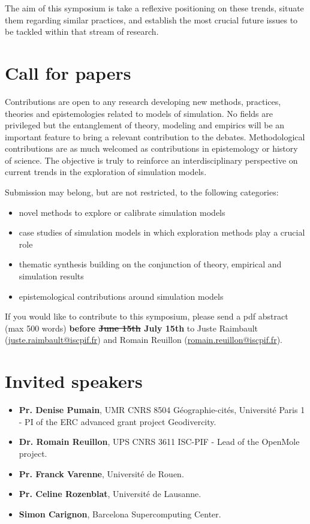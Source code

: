 \documentclass[11pt]{article}
\begin{document}
\medskip

The aim of this symposium is take a reflexive positioning on these trends, situate them regarding similar practices, and establish the most crucial future issues to be tackled within that stream of research.

\section*{Call for papers}

Contributions are open to any research developing new methods, practices, theories and epistemologies related to models of simulation. No fields are privileged but the entanglement of theory, modeling and empirics will be an important feature to bring a relevant contribution to the debates. Methodological contributions are as much welcomed as contributions in epistemology or history of science. The objective is truly to reinforce an interdisciplinary perspective on current trends in the exploration of simulation models.

\medskip

Submission may belong, but are not restricted, to the following categories:
\begin{itemize}
	\item novel methods to explore or calibrate simulation models
	\item case studies of simulation models in which exploration methods play a crucial role
	\item thematic synthesis building on the conjunction of theory, empirical and simulation results
	\item epistemological contributions around simulation models
\end{itemize}

\medskip
    
    
If you would like to contribute to this symposium, please send a pdf abstract (max 500 words) \textbf{before \sout{June 15th} July 15th} to Juste Raimbault (\href{mailto:juste.raimbault@iscpif.fr}{juste.raimbault@iscpif.fr}) and Romain Reuillon (\href{mailto:romain.reuillon@iscpif.fr}{romain.reuillon@iscpif.fr}). 
    


\section*{Invited speakers}

\begin{itemize}
    \item \textbf{Pr. Denise Pumain}, UMR CNRS 8504 Géographie-cités, Université Paris 1 - PI of the ERC advanced grant project Geodivercity.
    \item \textbf{Dr. Romain Reuillon}, UPS CNRS 3611 ISC-PIF - Lead of the OpenMole project.
    \item \textbf{Pr. Franck Varenne}, Université de Rouen.
    \item \textbf{Pr. Celine Rozenblat}, Université de Lausanne.
    \item \textbf{Simon Carignon}, Barcelona Supercomputing Center.
\end{itemize}
\end{document}
